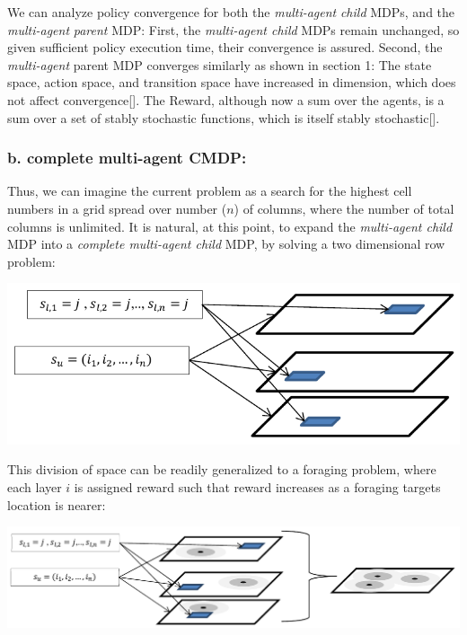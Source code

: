 \documentclass[compsoc,journal,letterpaper,10pt,draftclsnofoot,onecolumn]{IEEEtran}
\begin{document}
We can analyze policy convergence for both the \emph{multi-agent}
\emph{child} MDPs, and the \emph{multi-agent} \emph{parent} MDP: First,
the \emph{multi-agent child} MDPs remain unchanged, so given sufficient
policy execution time, their convergence is assured. Second, the
\emph{multi-agent} parent MDP converges similarly as shown in section 1:
The state space, action space, and transition space have increased in
dimension, which does not affect convergence{[}{]}. The Reward, although
now a sum over the agents, is a sum over a set of stably stochastic
functions, which is itself stably stochastic{[}{]}.

\subsubsection{b. complete multi-agent
CMDP:}\label{b.-complete-multi-agent-cmdp}

Thus, we can imagine the current problem as a search for the highest
cell numbers in a grid spread over number (\(n\)) of columns, where the
number of total columns is unlimited. It is natural, at this point, to
expand the \emph{multi-agent child} MDP into a \emph{complete
multi-agent child} MDP, by solving a two dimensional row problem:

\includegraphics{media/figure9.pdf}
 
This division of space can be readily generalized to a foraging problem,
where each layer \(i\) is assigned reward such that reward increases as
a foraging targets location is nearer:

\includegraphics{media/figure10.pdf}

\subsubsection{}\label{section}
\end{document}
